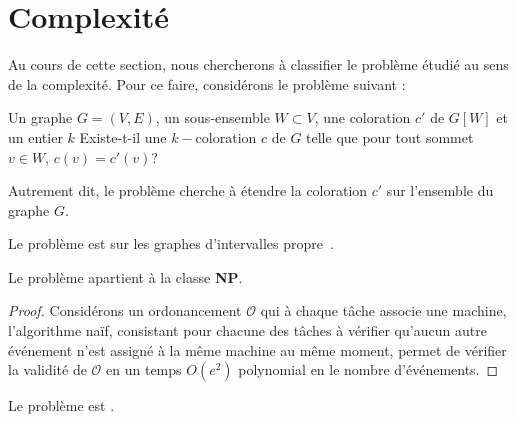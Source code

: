 \documentclass[a4paper,9pt]{book}
\begin{document}
\section{Complexité}
\label{scomplexite}

Au cours de cette section, nous chercherons à classifier le problème étudié au sens de la
complexité. Pour ce faire, considérons le problème suivant :

\dfdec{\precolor}
{Un graphe $G=(V, E)$, un sous-ensemble $W \subset V$, une coloration $c'$ de $G[W]$ et un
entier $k$}
{Existe-t-il une $k-$coloration $c$ de $G$ telle que pour tout sommet $v \in W$, $c(v) =
c'(v)$?}

Autrement dit, le problème \precolor cherche à étendre la coloration $c'$ sur l'ensemble du graphe
$G$.

\begin{nthrm}
    Le problème \precolor est \npc sur les graphes d'intervalles
    propre~\cite{marx2006precoloring}.
\end{nthrm}

\begin{nthrm}
    \label{fischedpi_in_np}
    Le problème \fischedpi apartient à la classe \textbf{NP}.
\end{nthrm}

\begin{proof}
    Considérons un ordonancement $\mathcal{O}$ qui à chaque tâche associe une machine, l'algorithme
    naïf, consistant pour chacune des tâches à vérifier qu'aucun autre événement n'est assigné à la
    même machine au même moment, permet de vérifier la validité de $\mathcal{O}$ en un temps
    $O(e^2)$ polynomial en le nombre d'événements.
\end{proof}

\begin{nthrm}
    Le problème \fischedpi est \npc.
\end{nthrm}
\end{document}
